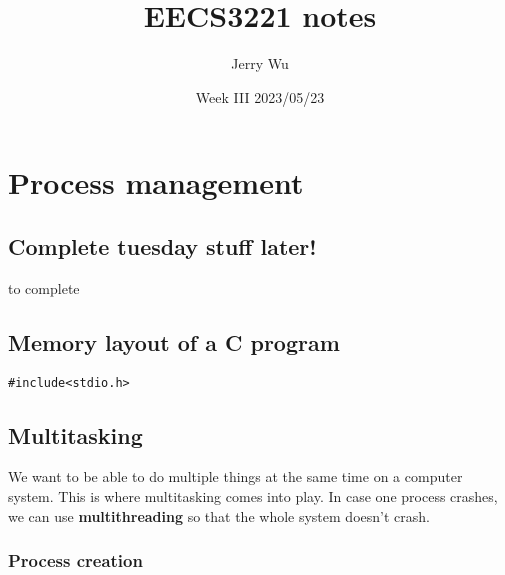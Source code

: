 \documentclass[12pt]{book}
\title{EECS3221 notes}
\author{Jerry Wu}
\date{Week III 2023/05/23}
\begin{document}
\maketitle

\chapter*{Process management}

\section*{Complete tuesday stuff later!}
to complete
\section*{Memory layout of a C program}

\begin{lstlisting}
#include<stdio.h>

\end{lstlisting}

\section*{Multitasking}
We want to be able to do multiple things at the same time on a computer system. This is where multitasking comes into play. In case one process crashes, we can use \textbf{multithreading} so that the whole system doesn't crash.
\subsection*{Process creation}
\end{document}

